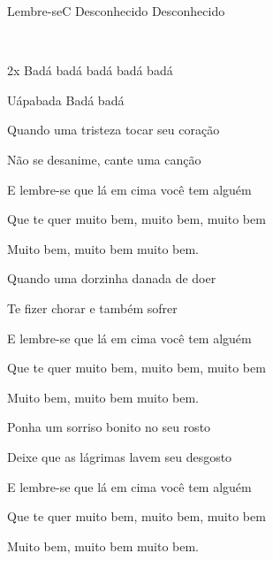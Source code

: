 \documentclass[a4,12pt,oneside]{book}
\newcommand{\RevDate}{\today}
\newcommand{\NotCCLIed}{\relax}
\begin{document}
\begin{song}{Lembre-se}{C}
  {Desconhecido}
  {Desconhecido}
  {}
  {\NotCCLIed}
  
	\renewcommand{\RevDate}{12 de maio de 2014}
  
	
	\ifChordBk
		{\vspace{-2em}\flushright{\Cchord \quad \Amchord \quad \Dmchord \quad \Gschord}\\}
	\fi
	
	\begin{SBBracket}{2x}
		Badá badá  badá   badá  badá
		
		Uápabada   Badá   badá
	\end{SBBracket}
  

	\begin{SBVerse}
		Quando uma tristeza tocar seu coração
		
		Não se desanime, cante uma canção
		
		E lembre-se que lá em cima você tem alguém
		
		Que te quer muito bem, muito bem, muito bem
		
		Muito bem, muito bem muito bem. 
	\end{SBVerse}
	
	
	\begin{SBVerse}
		Quando uma dorzinha danada de doer
		
		Te fizer chorar e também sofrer
		
		E lembre-se que lá em cima você tem alguém
		
		Que te quer muito bem, muito bem, muito bem
		
		Muito bem, muito bem muito bem.
	\end{SBVerse}
	
	
	\begin{SBVerse}
		Ponha um sorriso bonito no seu rosto
		
		Deixe que as lágrimas lavem seu desgosto   
		
		E lembre-se que lá em cima você tem alguém
		
		Que te quer muito bem, muito bem, muito bem
		
		Muito bem, muito bem muito bem. 
	\end{SBVerse}
\end{song}
\end{document}
